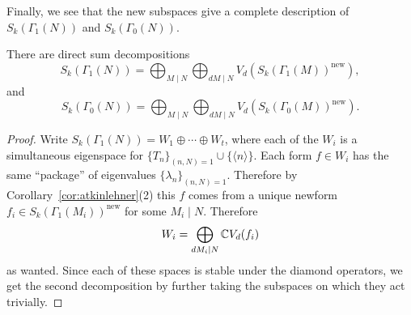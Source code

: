 Finally, we see that the new subspaces give a complete description of $S_k(\Gamma_1(N))$ and $S_k(\Gamma_0(N))$.
\begin{theorem}
  There are direct sum decompositions
\[
S_k(\Gamma_1(N)) = \bigoplus_{M\mid N} \bigoplus_{dM \mid N} V_d\left(S_k(\Gamma_1(M))^\text{new}\right),
\]
and
\[
S_k(\Gamma_0(N)) = \bigoplus_{M\mid N} \bigoplus_{dM \mid N} V_d\left(S_k(\Gamma_0(M))^\text{new}\right).
\]
\end{theorem}
\begin{proof}
  Write $S_k(\Gamma_1(N))=W_1\oplus\cdots\oplus W_t$, where each of the $W_i$ is a simultaneous eigenspace for $\{T_n\}_{(n,N)=1}\cup \{\langle n\rangle\}$. Each form $f\in W_i$ has the same ``package'' of eigenvalues $\{\lambda_n\}_{(n,N)=1}$. Therefore by Corollary~\ref{cor:atkinlehner}(2) this $f$ comes from a unique newform $f_i\in S_k(\Gamma_1(M_i))^\text{new}$ for some $M_i\mid N$. Therefore
\[
W_i=\bigoplus_{dM_i\mid N} \mathbb{C} V_d(f_i)
\]
as wanted. Since each of these spaces is stable under the diamond operators, we get the second decomposition by further taking the subspaces on which they act trivially.
\end{proof}



